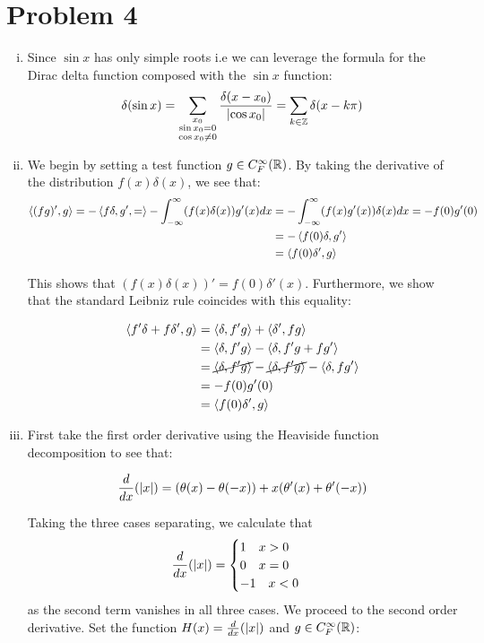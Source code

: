 \documentclass[12pt]{article}%
\newcommand{\disip}[2]{\left\langle #1, #2 \right\rangle}
\begin{document}
\section{Problem 4}
\begin{enumerate}[i.]
  \item Since $\sin{x}$ has only simple roots i.e we can leverage the formula for the Dirac delta function composed with the $\sin{x}$ function: \[ \delta(\sin{x}) = \sum_{\substack{x_0 \\ \sin{x_0} = 0 \\ \cos{x_0} \neq 0}} \frac{\delta(x - x_0)}{\abs{\cos{x_0}}} = \sum_{k \in \mathbb{Z}} \delta(x - k\pi)  \]

  \item We begin by setting a test function $g \in C_F^{\infty}({\mathbb{R}})$. By taking the derivative of the distribution $f(x)\delta(x)$, we see that:
  \begin{align*}
    \disip{(fg)'}{g} = - \disip{f\delta,g'} =  - \doubinfint (f(x)\delta(x))g'(x) dx & = - \doubinfint (f(x)g'(x))\delta(x) dx = -f(0)g'(0) \\
    & = - \disip{f(0)\delta}{g'} \\
    & = \disip{f(0)\delta'}{g}
  \end{align*}

  This shows that $(f(x)\delta(x))' = f(0)\delta'(x)$. Furthermore, we show that the standard Leibniz rule coincides with this equality:

  \begin{align*}
    \disip{f'\delta + f\delta'}{g}
     & = \disip{\delta}{f'g} + \disip{\delta'}{fg} \\
    & = \disip{\delta}{f'g} - \disip{\delta}{f'g + fg'} \\
    & = \cancel{\disip{\delta}{f'g}} - \cancel{\disip{\delta}{f'g}} - \disip{\delta}{fg'} \\
    & = -f(0)g'(0) \\
    & = \disip{f(0)\delta'}{g}
  \end{align*}

\item First take the first order derivative using the Heaviside function decomposition to see that:

\begin{equation*}
  \frac{d}{dx}(\abs{x}) = (\theta(x) - \theta(-x)) + x(\theta'(x) + \theta'(-x))
\end{equation*}

Taking the three cases separating, we calculate that
\[ \frac{d}{dx}(\abs{x}) = \begin{cases}
                              1 \quad x > 0 \\
                              0 \quad x = 0 \\
                              -1 \quad x < 0
                            \end{cases} \]
as the second term vanishes in all three cases. We proceed to the second order derivative. Set the function $H(x) = \frac{d}{dx}(\abs{x})$ and $g \in C_F^{\infty}({\mathbb{R}})$:


\end{enumerate}
\end{document}

